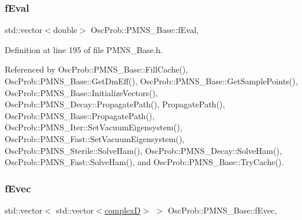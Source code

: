 \mbox{\label{classOscProb_1_1PMNS__Base_a6319c34d7decbb9d7d6da279c06e8c2d}} 
\subsubsection{\texorpdfstring{f\+Eval}{fEval}}
{\footnotesize\ttfamily std\+::vector$<$double$>$ Osc\+Prob\+::\+P\+M\+N\+S\+\_\+\+Base\+::f\+Eval\hspace{0.3cm}{\ttfamily [protected]}, {\ttfamily [inherited]}}



Definition at line 195 of file P\+M\+N\+S\+\_\+\+Base.\+h.



Referenced by Osc\+Prob\+::\+P\+M\+N\+S\+\_\+\+Base\+::\+Fill\+Cache(), Osc\+Prob\+::\+P\+M\+N\+S\+\_\+\+Base\+::\+Get\+Dm\+Eff(), Osc\+Prob\+::\+P\+M\+N\+S\+\_\+\+Base\+::\+Get\+Sample\+Points(), Osc\+Prob\+::\+P\+M\+N\+S\+\_\+\+Base\+::\+Initialize\+Vectors(), Osc\+Prob\+::\+P\+M\+N\+S\+\_\+\+Decay\+::\+Propagate\+Path(), Propagate\+Path(), Osc\+Prob\+::\+P\+M\+N\+S\+\_\+\+Base\+::\+Propagate\+Path(), Osc\+Prob\+::\+P\+M\+N\+S\+\_\+\+Iter\+::\+Set\+Vacuum\+Eigensystem(), Osc\+Prob\+::\+P\+M\+N\+S\+\_\+\+Fast\+::\+Set\+Vacuum\+Eigensystem(), Osc\+Prob\+::\+P\+M\+N\+S\+\_\+\+Sterile\+::\+Solve\+Ham(), Osc\+Prob\+::\+P\+M\+N\+S\+\_\+\+Decay\+::\+Solve\+Ham(), Osc\+Prob\+::\+P\+M\+N\+S\+\_\+\+Fast\+::\+Solve\+Ham(), and Osc\+Prob\+::\+P\+M\+N\+S\+\_\+\+Base\+::\+Try\+Cache().

\mbox{\label{classOscProb_1_1PMNS__Base_a87be137356c5f27ab83cab5e1298ef8f}} 
\subsubsection{\texorpdfstring{f\+Evec}{fEvec}}
{\footnotesize\ttfamily std\+::vector$<$ std\+::vector$<$\hyperlink{EigenPoint_8h_a67ca8e107e20610c3fff78d5e726ece0}{complexD}$>$ $>$ Osc\+Prob\+::\+P\+M\+N\+S\+\_\+\+Base\+::f\+Evec\hspace{0.3cm}{\ttfamily [protected]}, {\ttfamily [inherited]}}



